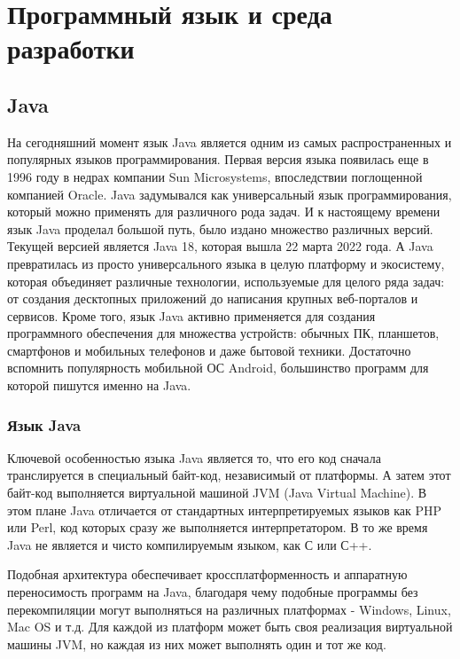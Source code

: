 
\section{Программный язык и среда разработки}

\subsection{Java}

На сегодняшний момент язык Java является одним из самых распространенных и популярных языков программирования. Первая версия языка появилась еще в 1996 году в недрах компании Sun Microsystems, впоследствии поглощенной компанией Oracle. Java задумывался как универсальный язык программирования, который можно применять для различного рода задач. И к настоящему времени язык Java проделал большой путь, было издано множество различных версий. Текущей версией является Java 18, которая вышла 22 марта 2022 года. А Java превратилась из просто универсального языка в целую платформу и экосистему, которая объединяет различные технологии, используемые для целого ряда задач: от создания десктопных приложений до написания крупных веб-порталов и сервисов. Кроме того, язык Java активно применяется для создания программного обеспечения для множества устройств: обычных ПК, планшетов, смартфонов и мобильных телефонов и даже бытовой техники. Достаточно вспомнить популярность мобильной ОС Android, большинство программ для которой пишутся именно на Java.

\subsubsection{Язык Java}

Ключевой особенностью языка Java является то, что его код сначала транслируется в специальный байт-код, независимый от платформы. А затем этот байт-код выполняется виртуальной машиной JVM (Java Virtual Machine). В этом плане Java отличается от стандартных интерпретируемых языков как PHP или Perl, код которых сразу же выполняется интерпретатором. В то же время Java не является и чисто компилируемым языком, как С или С++.

Подобная архитектура обеспечивает кроссплатформенность и аппаратную переносимость программ на Java, благодаря чему подобные программы без перекомпиляции могут выполняться на различных платформах - Windows, Linux, Mac OS и т.д. Для каждой из платформ может быть своя реализация виртуальной машины JVM, но каждая из них может выполнять один и тот же код.

